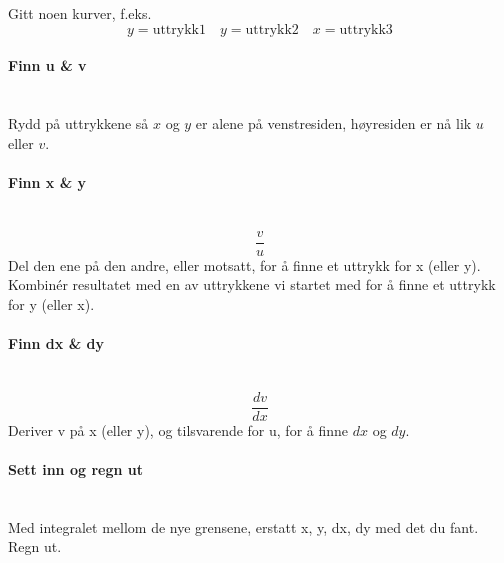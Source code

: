 Gitt noen kurver, f.eks.
$$y=\text{uttrykk1} \quad
  y=\text{uttrykk2} \quad
  x=\text{uttrykk3}$$

\paragraph{Finn u \& v} \mbox{} \\
Rydd på uttrykkene så $x$ og $y$ er alene på venstresiden,
høyresiden er nå lik $u$ eller $v$.



\paragraph{Finn x \& y} \mbox{} \\
$$\frac{v}{u}$$
Del den ene på den andre, eller motsatt, for å finne et uttrykk for x (eller y).
Kombinér resultatet med en av uttrykkene vi startet med for å finne
et uttrykk for y (eller x).



\paragraph{Finn dx \& dy} \mbox{} \\
$$\frac{dv}{dx}$$
Deriver v på x (eller y), og tilsvarende for u, for å finne $dx$ og $dy$.



\paragraph{Sett inn og regn ut} \mbox{} \\
Med integralet mellom de nye grensene, erstatt x, y, dx, dy med det du fant.
Regn ut.

